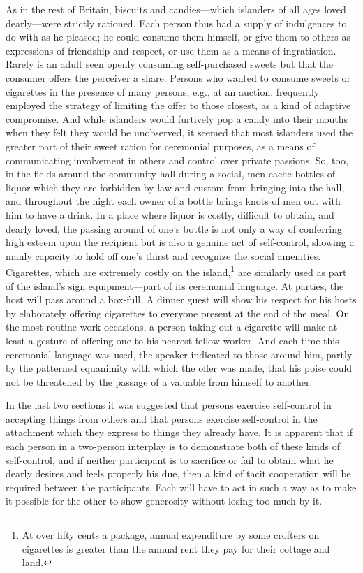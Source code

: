 \documentclass[twoside,symmetric,nobib,justified]{tufte-book}
\begin{document}
As in the rest of Britain, biscuits and candies---which islanders of all
ages loved dearly---were strictly rationed. Each person thus had a
supply of indulgences to do with as he pleased; he could consume them
himself, or give them to others as expressions of friendship and
respect, or use them as a means of ingratiation. Rarely is an adult seen
openly consuming self-purchased sweets but that the consumer offers the
perceiver a share. Persons who wanted to consume sweets or cigarettes in
the presence of many persons, e.g., at an auction, frequently employed
the strategy of limiting the offer to those closest, as a kind of
adaptive compromise. And while islanders would furtively pop a candy
into their mouths when they felt they would be unobserved, it seemed
that most islanders used the greater part of their sweet ration for
ceremonial purposes, as a means of communicating involvement in others
and control over private passions. So, too, in the fields around the
community hall during a social, men cache bottles of liquor which they
are forbidden by law and custom from bringing into the hall, and
throughout the night each owner of a bottle brings knots of men out with
him to have a drink. In a place where liquor is costly, difficult to
obtain, and dearly loved, the passing around of one's bottle is not only
a way of conferring high esteem upon the recipient but is also a genuine
act of self-control, showing a manly capacity to hold off one's thirst
and recognize the social amenities. Cigarettes, which are extremely
costly on the island,\footnote{At over fifty cents a package, annual
  expenditure by some crofters on cigarettes is greater than the annual
  rent they pay for their cottage and land.} are similarly used as part
of the island's sign equipment---part of its ceremonial language. At
parties, the host will pass around a box-full. A dinner guest will show
his respect for his hosts by elaborately offering cigarettes to everyone
present at the end of the meal. On the most routine work occasions, a
person taking out a cigarette will make at least a gesture of offering
one to his nearest fellow-worker. And each time this ceremonial language
was used, the speaker indicated to those around him, partly by the
patterned equanimity with which the offer was made, that his poise could
not be threatened by the passage of a valuable from himself to another.

\enlargethispage{\baselineskip}

In the last two sections it was suggested that persons exercise
self-control in accepting things from others and that persons exercise
self-control in the attachment which they express to things they already
have. It is apparent that if each person in a two-person interplay is to
demonstrate both of these kinds of self-control, and if neither
participant is to sacrifice or fail to obtain what he dearly desires and
feels properly his due, then a kind of tacit cooperation will be
required between the participants. Each will have to act in such a way
as to make it possible for the other to show generosity without losing
too much by it.
\end{document}
